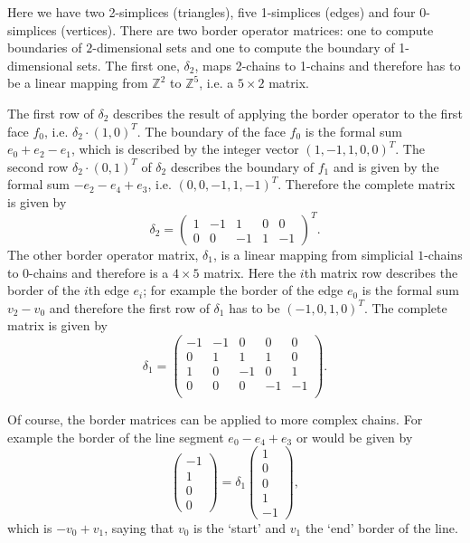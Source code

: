 \begin{center}
\def\svgwidth{13cm}

\end{center}
Here we have two 2-simplices (triangles), five 1-simplices (edges) and four 0-simplices (vertices). There are two border operator matrices: one to compute boundaries of $2$-dimensional sets and one to compute the boundary of 1-dimensional sets. The first one, $\delta_2$, maps 2-chains to 1-chains and therefore has to be a linear mapping from $\mathbb Z^2$ to $\mathbb Z^5$, i.e. a $5 \times 2$ matrix.

The first row of $\delta_2$ describes the result of applying the border operator to the first face $f_0$, i.e. $\delta_2 \cdot (1,0)^T$. The boundary of the face $f_0$ is the formal sum $e_0 + e_2 - e_1$, which is described by the integer vector $(1,-1,1,0,0)^T$. The second row $\delta_2 \cdot (0,1)^T$ of $\delta_2$ describes the boundary of $f_1$ and is given by the formal sum $-e_2 -e_4 + e_3$, i.e. $(0,0,-1,1,-1)^T$. Therefore the complete matrix is given by
\[\delta_2 = \begin{pmatrix}
1 & -1 & 1 &0&0\\
0& 0& -1 & 1 & -1
\end{pmatrix}^T.\]
The other border operator matrix, $\delta_1$, is a linear mapping from simplicial $1$-chains to $0$-chains and therefore is a $4 \times 5$ matrix. Here the $i$th matrix row describes the border of the $i$th edge $e_i$; for example the border of the edge $e_0$ is the formal sum $v_2 -v_0$ and therefore the first row of $\delta_1$ has to be $(-1,0,1,0)^T$. The complete matrix is given by
\[\delta_1 = \begin{pmatrix}
-1&-1&0 &0 & 0\\
0&1&1 &1 & 0\\
1&0&-1 &0&1\\
0&0&0&-1&-1\\
\end{pmatrix}. \]

Of course, the border matrices can be applied to more complex chains. For example the border of the line segment $e_0 -e_4 + e_3$ or would be given by
\[\begin{pmatrix}
-1\\ 1\\ 0 \\0 
\end{pmatrix} = \delta_1\begin{pmatrix}
1\\0\\ 0\\1\\-1
\end{pmatrix},\]
which is $-v_0 + v_1$, saying that $v_0$ is the `start' and $v_1$ the `end' border of the line. 

